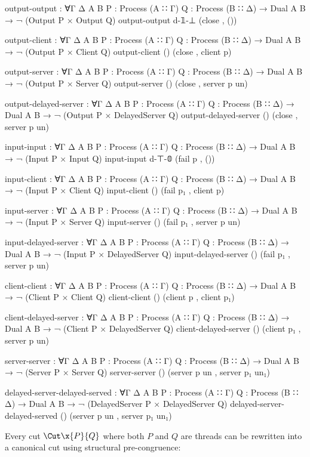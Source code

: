 \begin{code}[hide]
output-output :
  ∀{Γ Δ A B} {P : Process (A ∷ Γ)} {Q : Process (B ∷ Δ)} → Dual A B → ¬ (Output P × Output Q)
output-output d-𝟙-⊥ (close , ())

output-client :
  ∀{Γ Δ A B} {P : Process (A ∷ Γ)} {Q : Process (B ∷ Δ)} → Dual A B → ¬ (Output P × Client Q)
output-client () (close , client p)

output-server :
  ∀{Γ Δ A B} {P : Process (A ∷ Γ)} {Q : Process (B ∷ Δ)} → Dual A B → ¬ (Output P × Server Q)
output-server () (close , server p un)

output-delayed-server :
  ∀{Γ Δ A B} {P : Process (A ∷ Γ)} {Q : Process (B ∷ Δ)} → Dual A B → ¬ (Output P × DelayedServer Q)
output-delayed-server () (close , server p un)

input-input :
  ∀{Γ Δ A B} {P : Process (A ∷ Γ)} {Q : Process (B ∷ Δ)} → Dual A B → ¬ (Input P × Input Q)
input-input d-⊤-𝟘 (fail p , ())

input-client :
  ∀{Γ Δ A B} {P : Process (A ∷ Γ)} {Q : Process (B ∷ Δ)} → Dual A B → ¬ (Input P × Client Q)
input-client () (fail p₁ , client p)

input-server :
  ∀{Γ Δ A B} {P : Process (A ∷ Γ)} {Q : Process (B ∷ Δ)} → Dual A B → ¬ (Input P × Server Q)
input-server () (fail p₁ , server p un)

input-delayed-server :
  ∀{Γ Δ A B} {P : Process (A ∷ Γ)} {Q : Process (B ∷ Δ)} → Dual A B → ¬ (Input P × DelayedServer Q)
input-delayed-server () (fail p₁ , server p un)

client-client :
  ∀{Γ Δ A B} {P : Process (A ∷ Γ)} {Q : Process (B ∷ Δ)} → Dual A B → ¬ (Client P × Client Q)
client-client () (client p , client p₁)

client-delayed-server :
  ∀{Γ Δ A B} {P : Process (A ∷ Γ)} {Q : Process (B ∷ Δ)} → Dual A B → ¬ (Client P × DelayedServer Q)
client-delayed-server () (client p₁ , server p un)

server-server :
  ∀{Γ Δ A B} {P : Process (A ∷ Γ)} {Q : Process (B ∷ Δ)} → Dual A B → ¬ (Server P × Server Q)
server-server () (server p un , server p₁ un₁)

delayed-server-delayed-served :
  ∀{Γ Δ A B} {P : Process (A ∷ Γ)} {Q : Process (B ∷ Δ)} → Dual A B → ¬ (DelayedServer P × DelayedServer Q)
delayed-server-delayed-served () (server p un , server p₁ un₁)
\end{code}

Every cut $\Cut\x{P}{Q}$ where both $P$ and $Q$ are threads can be rewritten
into a canonical cut using structural pre-congruence:

